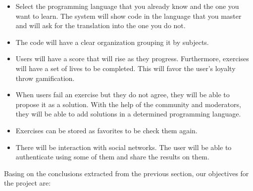 \begin{itemize}
\item
Select the programming language that you already know and the one you want to learn. The system will show code in the language that you master and will ask for the translation into the one you do not.

\item
The code will have a clear organization grouping it by subjects.

\item
Users will have a score that will rise as they progress. Furthermore, exercises will have a set of lives to be completed. This will favor the user's loyalty throw gamification.

\item
When users fail an exercise but they do not agree, they will be able to propose it as a solution. With the help of the community and moderators, they will be able to add solutions in a determined programming language. 

\item
Exercises can be stored as favorites to be check them again.

\item
There will be interaction with social networks. The user will be able to authenticate using some of them and share the results on them. 

\end{itemize}
Basing on the conclusions extracted from the previous section, our objectives for the project are:

